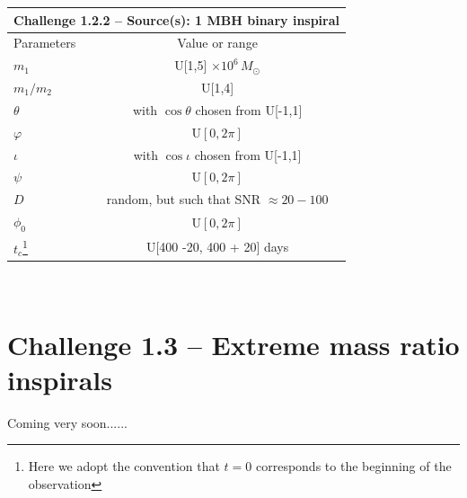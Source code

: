 \documentclass[11pt]{report}
\begin{document}
\begin{description}
\begin{center}
\begin{tabular}{l|c}
\hline \hline
\multicolumn{2}{c}{{\bf Challenge 1.2.2 -- Source(s): 1 MBH binary inspiral}} \\
\hline
Parameters & Value or range \\
\hline
$m_1$             & U[1,5] $\times 10^6\,M_\odot$ \\
$m_1/m_2$         & U[1,4] \\
$\theta$          & with $\cos\theta$ chosen from U[-1,1]\\
$\varphi$         & U$[0,2\pi]$ \\ 
$\iota$           & with $\cos\iota$ chosen from U[-1,1]\\ 
$\psi$            & U$[0,2\pi]$ \\
$D$               & random, but such that SNR $\approx 20-100$ \\
$\phi_0$          & U$[0,2\pi]$ \\
$t_c$\footnote{Here we adopt the convention that $t = 0$ corresponds to the beginning of the observation}             & U[400 -20, 400 + 20] days \\
\hline \hline
\end{tabular} \\
\end{center}

\end{description}

\section{Challenge 1.3 -- Extreme mass ratio inspirals}

Coming very soon......

\begin{thebibliography}{}

\end{thebibliography}
\end{document}
